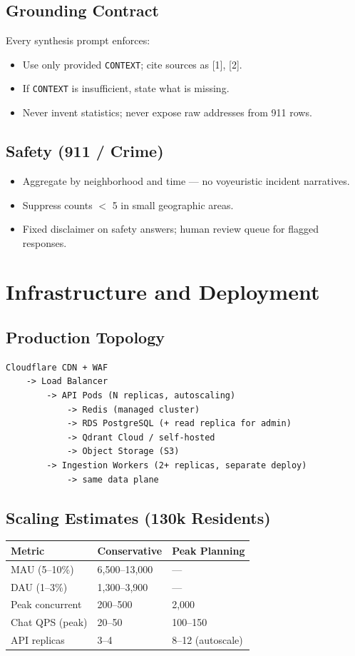 \documentclass[11pt,a4paper]{article}
\begin{document}
\subsection{Grounding Contract}
Every synthesis prompt enforces:
\begin{itemize}[noitemsep]
  \item Use only provided \texttt{CONTEXT}; cite sources as [1], [2].
  \item If \texttt{CONTEXT} is insufficient, state what is missing.
  \item Never invent statistics; never expose raw addresses from 911 rows.
\end{itemize}

\subsection{Safety (911 / Crime)}
\begin{itemize}[noitemsep]
  \item Aggregate by neighborhood and time --- no voyeuristic incident narratives.
  \item Suppress counts $<$ 5 in small geographic areas.
  \item Fixed disclaimer on safety answers; human review queue for flagged responses.
\end{itemize}

\section{Infrastructure and Deployment}

\subsection{Production Topology}
\begin{verbatim}
Cloudflare CDN + WAF
    -> Load Balancer
        -> API Pods (N replicas, autoscaling)
            -> Redis (managed cluster)
            -> RDS PostgreSQL (+ read replica for admin)
            -> Qdrant Cloud / self-hosted
            -> Object Storage (S3)
        -> Ingestion Workers (2+ replicas, separate deploy)
            -> same data plane
\end{verbatim}

\subsection{Scaling Estimates (130k Residents)}
\begin{table}[h]
\centering
\small
\begin{tabular}{@{}lll@{}}
\toprule
\textbf{Metric} & \textbf{Conservative} & \textbf{Peak Planning} \\
\midrule
MAU (5--10\%) & 6,500--13,000 & --- \\
DAU (1--3\%) & 1,300--3,900 & --- \\
Peak concurrent & 200--500 & 2,000 \\
Chat QPS (peak) & 20--50 & 100--150 \\
API replicas & 3--4 & 8--12 (autoscale) \\
\bottomrule
\end{tabular}
\end{table}
\end{document}
